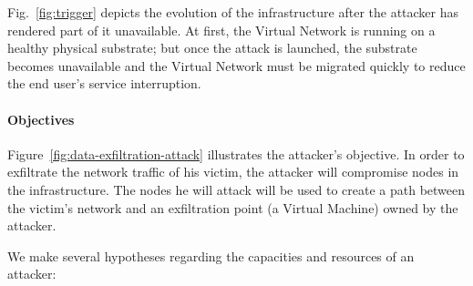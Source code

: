 \label{sec:attack_model}

Fig.~\ref{fig:trigger} depicts the evolution of the infrastructure after the attacker has rendered part of it unavailable. 
At first, the Virtual Network is running on a healthy physical substrate; but once the attack is launched, the substrate becomes unavailable and the Virtual Network must be migrated quickly to reduce the end user's service interruption.

\paragraph{Objectives}
Figure~\ref{fig:data-exfiltration-attack} illustrates the attacker's objective.
In order to exfiltrate the network traffic of his victim, the attacker will compromise nodes in the infrastructure. The nodes he will attack will be used to create a path between the victim's network and an exfiltration point (\eg a Virtual Machine) owned by the attacker.

We make several hypotheses regarding the capacities and resources of an attacker:
